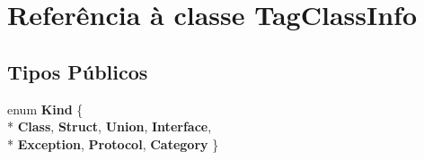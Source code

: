 \hypertarget{class_tag_class_info}{\section{Referência à classe Tag\-Class\-Info}
\label{class_tag_class_info}
}
\subsection*{Tipos Públicos}
\begin{DoxyCompactItemize}
\item 
enum {\bfseries Kind} \{ \\*
{\bfseries Class}, 
{\bfseries Struct}, 
{\bfseries Union}, 
{\bfseries Interface}, 
\\*
{\bfseries Exception}, 
{\bfseries Protocol}, 
{\bfseries Category}
 \}
\end{DoxyCompactItemize}
